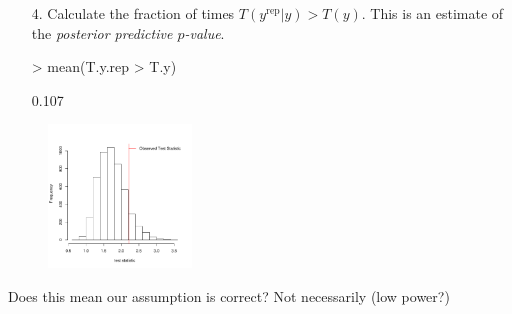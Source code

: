 \documentclass[handout]{beamer}
\begin{document}
\begin{frame}[fragile]
\begin{enumerate}
\item[4.] Calculate the fraction of times $T(y^{\mathrm{rep}} | y) >
T(y)$.  \pause  This is an estimate of the \textit{posterior
predictive $p$-value}. 
\medskip
\pause
\tiny
\begin{Schunk}
\begin{Sinput}
> mean(T.y.rep > T.y)
\end{Sinput}
\begin{Soutput}
[1] 0.107
\end{Soutput}
\end{Schunk}
\end{enumerate}
\begin{figure}[!htp]
\includegraphics[width = 1.5in, height=1.5in]{modelcheck-yearhist.pdf}
\end{figure}
\normalsize
\pause
Does this mean our assumption is correct?  \pause Not necessarily (low
power?)
\end{frame}
\end{document}

